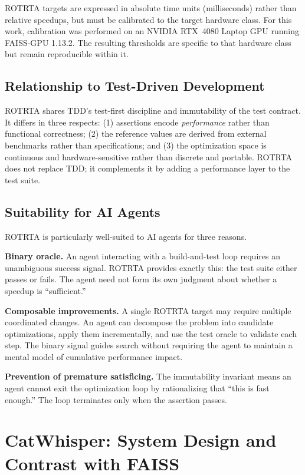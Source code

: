 \documentclass[conference]{IEEEtran}
\begin{document}
ROTRTA targets are expressed in absolute time units (milliseconds) rather than
relative speedups, but must be calibrated to the target hardware class.  For
this work, calibration was performed on an NVIDIA RTX~4080 Laptop GPU running
FAISS-GPU 1.13.2.  The resulting thresholds are specific to that hardware
class but remain reproducible within it.

\subsection{Relationship to Test-Driven Development}

ROTRTA shares TDD's test-first discipline and immutability of the test
contract.  It differs in three respects: (1) assertions encode
\emph{performance} rather than functional correctness; (2) the reference
values are derived from external benchmarks rather than specifications;
and (3) the optimization space is continuous and hardware-sensitive rather
than discrete and portable.  ROTRTA does not replace TDD; it complements
it by adding a performance layer to the test suite.

\subsection{Suitability for AI Agents}

ROTRTA is particularly well-suited to AI agents for three reasons.

\textbf{Binary oracle.}  An agent interacting with a build-and-test loop
requires an unambiguous success signal.  ROTRTA provides exactly this: the
test suite either passes or fails.  The agent need not form its own judgment
about whether a speedup is ``sufficient.''

\textbf{Composable improvements.}  A single ROTRTA target may require
multiple coordinated changes.  An agent can decompose the problem into
candidate optimizations, apply them incrementally, and use the test oracle
to validate each step.  The binary signal guides search without requiring
the agent to maintain a mental model of cumulative performance impact.

\textbf{Prevention of premature satisficing.}  The immutability invariant
means an agent cannot exit the optimization loop by rationalizing that
``this is fast enough.''  The loop terminates only when the assertion passes.

\section{CatWhisper: System Design and Contrast with FAISS}
\label{sec:catwhisper}
\end{document}

